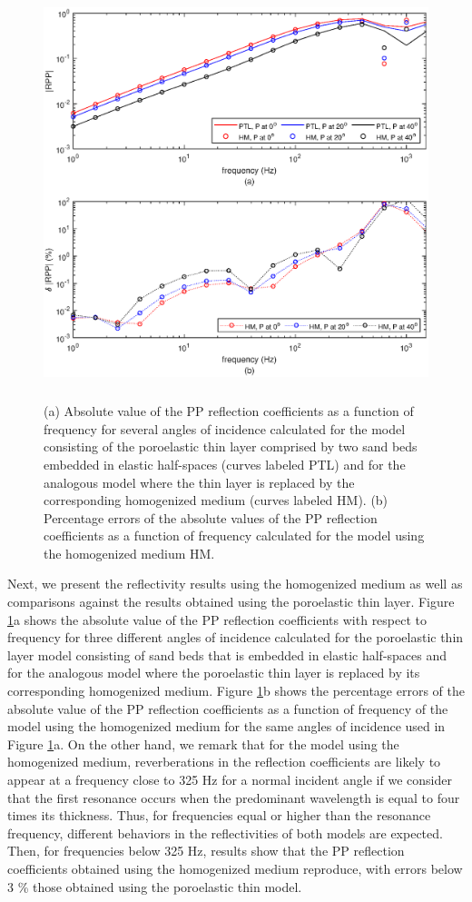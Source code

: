 \documentclass[draft]{agujournal2019}
\begin{document}
\begin{figure}[!ht]
\centering
        \includegraphics[width= 130mm, height=120mm]{Figure3.eps}
\caption{ (a) Absolute value of the PP reflection coefficients as a function of frequency for several angles of incidence calculated for the model consisting of the poroelastic thin layer comprised by two sand beds embedded in elastic half-spaces (curves labeled PTL) and for the analogous model where the thin layer is replaced by the corresponding homogenized medium (curves labeled HM). (b) Percentage errors of the absolute values of the PP reflection coefficients as a function of frequency calculated for the model using the homogenized medium HM.}
\label{fig.3}
\end{figure}

Next, we present the reflectivity results using the homogenized medium as well as comparisons against the results obtained using the poroelastic thin layer. 
Figure \ref{fig.3}a shows the absolute value of the PP reflection coefficients with respect to frequency for three different angles of incidence calculated for the poroelastic thin layer model consisting of sand beds that is embedded in elastic half-spaces and for the analogous model where the poroelastic thin layer is replaced by its corresponding homogenized medium.  
Figure \ref{fig.3}b shows the percentage errors of the absolute value of the PP reflection coefficients as a function of frequency of the model using the homogenized medium for the same angles of incidence used in Figure \ref{fig.3}a. 
On the other hand, we remark that for the model using the homogenized medium, reverberations in the reflection coefficients are likely to appear at a frequency close to 325 Hz for a normal incident angle if we consider that the first resonance occurs when the predominant wavelength is  equal to four times its thickness. Thus, for frequencies equal or higher than the resonance frequency, different behaviors in the reflectivities of both models are expected. Then, for frequencies below 325 Hz, results show that the PP reflection coefficients obtained using the homogenized medium reproduce, with errors below 3 \% those obtained using the poroelastic thin model. 
\end{document}
